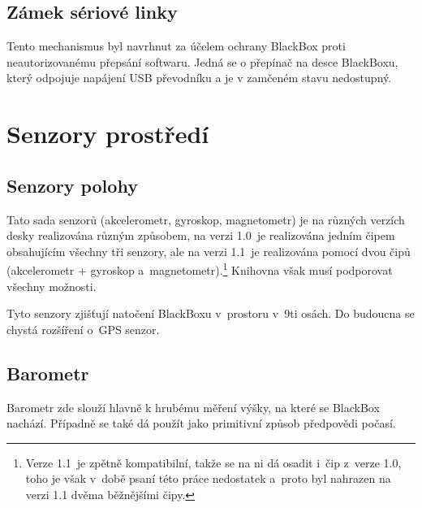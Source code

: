 \subsection{Zámek sériové linky}
Tento mechanismus byl navrhnut za účelem ochrany BlackBox proti neautorizovanému přepsání softwaru.
Jedná se o přepínač na desce BlackBoxu, který odpojuje napájení USB převodníku a je v zamčeném stavu nedostupný.

\section{Senzory prostředí}

\subsection{Senzory polohy}
Tato sada senzorů (akcelerometr, gyroskop, magnetometr) je na různých verzích desky realizována různým způsobem, na verzi 1.0~je realizována jedním čipem obsahujícím všechny tři senzory, ale na verzi 1.1~je realizována pomocí dvou čipů (akcelerometr + gyroskop a~magnetometr).\footnote{Verze 1.1~je zpětně kompatibilní, takže se na ni dá osadit i~čip z~verze 1.0, toho je však v~době psaní této práce nedostatek a~proto byl nahrazen na verzi 1.1 dvěma běžnějšími čipy.}
Knihovna však musí podporovat všechny možnosti.

Tyto senzory zjišťují natočení BlackBoxu v~prostoru v~9ti osách.
Do budoucna se chystá rozšíření o~GPS senzor.

\subsection{Barometr}
Barometr zde slouží hlavně k hrubému měření výšky, na které se BlackBox nachází.
Případně se také dá použít jako primitivní způsob předpovědi počasí.